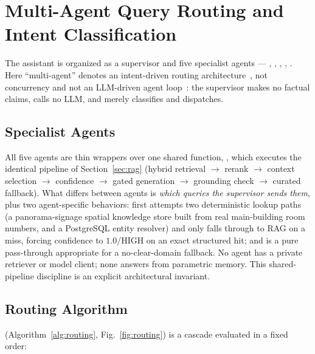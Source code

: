 \section{Multi-Agent Query Routing and Intent Classification}
\label{sec:agents}



The assistant is organized as a supervisor and five specialist agents ---
, , ,
, . Here ``multi-agent''
denotes an intent-driven routing architecture~\cite{wooldridge2009mas}, not
concurrency and not an LLM-driven agent loop~\cite{wu2023autogen}: the
supervisor makes no factual claims, calls no LLM, and merely classifies and
dispatches.

\subsection{Specialist Agents}
All five agents are thin wrappers over one shared function,
, which executes the identical pipeline of
Section~\ref{sec:rag} (hybrid retrieval $\to$ rerank $\to$ context
selection $\to$ confidence $\to$ gated generation $\to$ grounding check
$\to$ curated fallback). What differs between agents is \emph{which queries
the supervisor sends them}, plus two agent-specific behaviors:
 first attempts two deterministic lookup paths
(a panorama-signage spatial knowledge store built from real main-building
room numbers, and a PostgreSQL entity resolver) and only falls through to
RAG on a miss, forcing confidence to $1.0$/HIGH on an exact structured
hit; and  is a pure pass-through appropriate for a
no-clear-domain fallback. No agent has a private retriever or model client;
none answers from parametric memory. This shared-pipeline discipline is an
explicit architectural invariant.

\subsection{Routing Algorithm}
 (Algorithm~\ref{alg:routing},
Fig.~\ref{fig:routing}) is a cascade evaluated in a fixed order:

